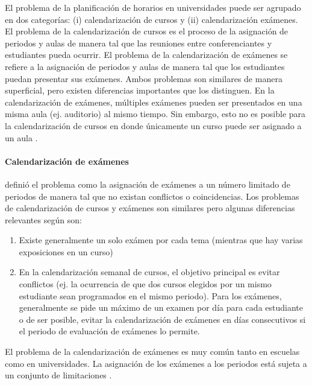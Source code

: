 \documentclass[spanish,draft,12pt,headsepline,footsepline,paper=letter]{scrreprt}
\begin{document}
El problema de la planificación de horarios en universidades puede ser agrupado en dos categorías: (i) calendarización de cursos y (ii) calendarización exámenes.
El problema de la calendarización de cursos es el proceso de la asignación de periodos y aulas de manera tal que las reuniones entre conferenciantes y estudiantes pueda ocurrir.
El problema de la calendarización de exámenes se refiere a la asignación de periodos y aulas de manera tal que los estudiantes puedan presentar sus exámenes.
Ambos problemas son similares de manera superficial, pero existen diferencias importantes que los distinguen.
En la calendarización de exámenes, múltiples exámenes pueden ser presentados en una misma aula (ej. auditorio) al mismo tiempo.
Sin embargo, esto no es posible para la calendarización de cursos en donde únicamente un curso puede ser asignado a un aula \citep[p.~11]{abdullah06heuristic-approaches}.

\paragraph{Calendarización de exámenes}

\citet[p.~4]{carter95recent-developments} definió el problema como la asignación de exámenes a un número limitado de periodos de manera tal que no existan conflictos o coincidencias. Los problemas de calendarización de cursos y exámenes son similares pero algunas diferencias relevantes según \citet[p.~159]{werra85an-introduction-to-timetabling} son:
\begin{enumerate}[a]
\item Existe generalmente un solo exámen por cada tema (mientras que hay varias exposiciones en un curso)
\item En la calendarización semanal de cursos, el objetivo principal es evitar conflictos (ej. la ocurrencia de que dos cursos elegidos por un mismo estudiante sean programados en el mismo periodo). Para los exámenes, generalmente se pide un máximo de un examen por día para cada estudiante o de ser posible, evitar la calendarización de exámenes en días consecutivos si el periodo de evaluación de exámenes lo permite.
\end{enumerate}
El problema de la calendarización de exámenes es muy común tanto en escuelas como en universidades. La asignación de los exámenes a los periodos está sujeta a un conjunto de limitaciones \citep[p.~12]{abdullah06heuristic-approaches}.
\end{document}
